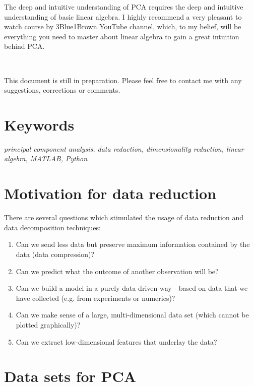 \documentclass[10pt,twocolumn]{article}
\begin{document}
The deep and intuitive understanding of PCA requires the deep and intuitive understanding of basic linear algebra. I highly recommend a very pleasant to watch course by 3Blue1Brown YouTube channel, which, to my belief, will be everything you need to master about linear algebra to gain a great intuition behind PCA.

\,\,

This document is still in preparation. Please feel free to contact me with any suggestions, corrections or comments.

\section*{Keywords}

\textit{principal component analysis, data reduction, dimensionality reduction, linear algebra, MATLAB\textregistered, Python}

\tableofcontents

\newpage

\section{Motivation for data reduction}

There are several questions which stimulated the usage of data reduction and data decomposition techniques:

\begin{enumerate}
\item Can we send less data but preserve maximum information contained by the data (data compression)?

\item Can we predict what the outcome of another observation will be?

\item Can we build a model in a purely data-driven way - based on data that we have collected (e.g. from experiments or numerics)?

\item Can we make sense of a large, multi-dimensional data set (which cannot be plotted graphically)?

\item Can we extract low-dimensional features that underlay the data?
\end{enumerate}

\section{Data sets for PCA}
\end{document}
